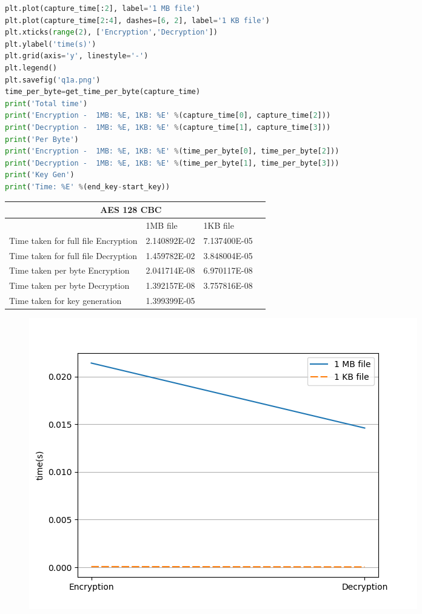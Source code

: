 \documentclass[12pt]{article}%
\begin{document}
\begin{lstlisting}[language=Python]
plt.plot(capture_time[:2], label='1 MB file')
plt.plot(capture_time[2:4], dashes=[6, 2], label='1 KB file')
plt.xticks(range(2), ['Encryption','Decryption'])
plt.ylabel('time(s)')
plt.grid(axis='y', linestyle='-')
plt.legend()
plt.savefig('q1a.png')
time_per_byte=get_time_per_byte(capture_time)
print('Total time')
print('Encryption -  1MB: %E, 1KB: %E' %(capture_time[0], capture_time[2]))
print('Decryption -  1MB: %E, 1KB: %E' %(capture_time[1], capture_time[3]))
print('Per Byte')
print('Encryption -  1MB: %E, 1KB: %E' %(time_per_byte[0], time_per_byte[2]))
print('Decryption -  1MB: %E, 1KB: %E' %(time_per_byte[1], time_per_byte[3]))
print('Key Gen')
print('Time: %E' %(end_key-start_key))
\end{lstlisting}
\begin{tabular}{ |p{8cm}|p{3cm}|p{3cm}|p{3cm} }
 \hline
 \multicolumn{3}{|c|}{AES 128 CBC} \\
 \hline
	 & 1MB file & 1KB file\\
 \hline
 Time taken for full file Encryption   &   2.140892E-02   &  7.137400E-05 \\
  \hline
 Time taken for full file Decryption &  1.459782E-02  & 3.848004E-05	\\
 \hline
 Time taken per byte Encryption   &  2.041714E-08    & 6.970117E-08  \\
  \hline
 Time taken per byte Decryption & 1.392157E-08   & 3.757816E-08	\\
 \hline
 Time taken for key generation &   1.399399E-05  & 	\\
 \hline
\end{tabular}
\begin{figure}[h]
    \centering
	\includegraphics[scale=0.5]{q1a}
\end{figure}
 
\end{document}
